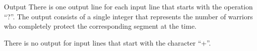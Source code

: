 Output
There is one output line for each input line that starts with the operation “?”. The output consists of a single integer that represents the number of warriors who completely protect the corresponding segment at the time.   

     There is no output for input lines that start with the character “+”.